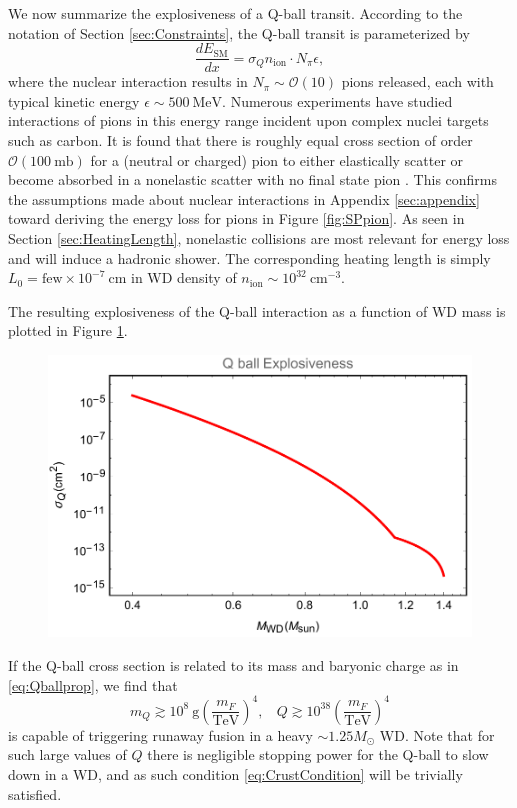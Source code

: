 \documentclass[twocolumn,showpacs,preprintnumbers,amsmath,amssymb,prd]{revtex4}
\newcommand{\OO}{\mathcal{O}}
\def\r{\right)}
\def\l{\left(}
\begin{document}
We now summarize the explosiveness of a Q-ball transit. According to the notation of Section \ref{sec:Constraints}, the Q-ball transit is parameterized by 
\begin{equation}
\frac{d E_\text{SM}}{d x} = \sigma_Q n_\text{ion} \cdot N_\pi \epsilon,
\end{equation}
where the nuclear interaction results in $N_\pi \sim \OO(10)$ pions released, each with typical kinetic energy $\epsilon \sim 500 ~\text{MeV}$. Numerous experiments have studied interactions of pions in this energy range incident upon complex nuclei targets such as carbon. It is found that there is roughly equal cross section of order $\OO (100 ~\text{mb})$ for a (neutral or charged) pion to either elastically scatter or become absorbed in a nonelastic scatter with no final state pion \cite{Pionnuclear}. This confirms the assumptions made about nuclear interactions in Appendix \ref{sec:appendix} toward deriving the energy loss for pions in Figure \ref{fig:SPpion}. As seen in Section \ref{sec:HeatingLength}, nonelastic collisions are most relevant for energy loss and will induce a hadronic shower. The corresponding heating length is simply $L_0 = \text{few} \times 10^{-7} ~\text{cm}$ in WD density of $n_\text{ion} \sim 10^{32} ~\text{cm}^{-3}$. 

The resulting explosiveness of the Q-ball interaction as a function of WD mass is plotted in Figure \ref{fig:boomQball}. 
\begin{figure}
\label{fig:boomQball}
\includegraphics[scale=.45]{boomQball.pdf}
\end{figure}
If the Q-ball cross section is related to its mass and baryonic charge as in \eqref{eq:Qballprop}, we find that
\begin{equation}
\label{eq:Qballbound}
m_Q \gtrsim 10^8 ~\text{g} \l\frac{m_F}{\text{TeV}}\r^4, ~~~~ Q \gtrsim 10^{38} \l\frac{m_F}{\text{TeV}}\r^4
\end{equation}
is capable of triggering runaway fusion in a heavy $\sim 1.25 M_{\odot}$ WD. Note that for such large values of $Q$ there is negligible stopping power for the Q-ball to slow down in a WD, and as such condition \eqref{eq:CrustCondition} will be trivially satisfied. 
\end{document}
